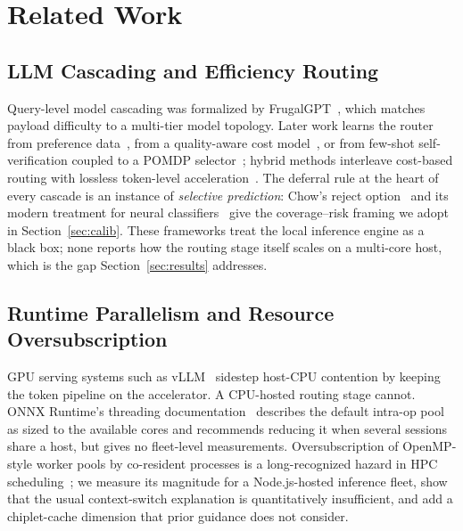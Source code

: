 \documentclass[conference]{IEEEtran}
\begin{document}
\section{Related Work}
\label{sec:relatedwork}

\subsection{LLM Cascading and Efficiency Routing}
Query-level model cascading was formalized by FrugalGPT~\cite{frugalgpt}, which matches payload difficulty to a multi-tier model topology. Later work learns the router from preference data~\cite{routellm}, from a quality-aware cost model~\cite{hybridllm}, or from few-shot self-verification coupled to a POMDP selector~\cite{automix}; hybrid methods interleave cost-based routing with lossless token-level acceleration~\cite{fastercascades}. The deferral rule at the heart of every cascade is an instance of \emph{selective prediction}: Chow's reject option~\cite{chow1970} and its modern treatment for neural classifiers~\cite{geifman2017} give the coverage--risk framing we adopt in Section~\ref{sec:calib}. These frameworks treat the local inference engine as a black box; none reports how the routing stage itself scales on a multi-core host, which is the gap Section~\ref{sec:results} addresses.

\subsection{Runtime Parallelism and Resource Oversubscription}
GPU serving systems such as vLLM~\cite{vllm} sidestep host-CPU contention by keeping the token pipeline on the accelerator. A CPU-hosted routing stage cannot. ONNX Runtime's threading documentation~\cite{ort_docs} describes the default intra-op pool as sized to the available cores and recommends reducing it when several sessions share a host, but gives no fleet-level measurements. Oversubscription of OpenMP-style worker pools by co-resident processes is a long-recognized hazard in HPC scheduling~\cite{iancu2010}; we measure its magnitude for a Node.js-hosted inference fleet, show that the usual context-switch explanation is quantitatively insufficient, and add a chiplet-cache dimension that prior guidance does not consider.
\end{document}
